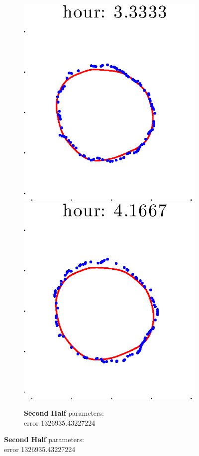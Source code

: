 \documentclass[12pt]{article}
\begin{document}
\begin{figure}[h!]
\begin{subfigure}[b]{.3\textwidth}
		\includegraphics[height=.15\textheight]{Pos5exp2/secondhalf/second5.eps}
		\includegraphics[height=.15\textheight]{Pos5exp2/secondhalf/second6.eps}
		\caption{\textbf{Second Half} parameters: \\error 1326935.43227224}
	\end{subfigure}
\end{figure}
\end{document}
